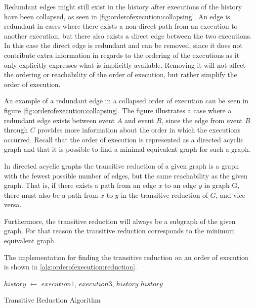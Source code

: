 	\newpar Redundant edges might still exist in the history after executions of the history have been collapsed, as seen in \autoref{fig:orderofexecution:collapsing}. An edge is redundant in cases where there exists a non-direct path from an execution to another execution, but there also exists a direct edge between the two executions. In this case the direct edge is redundant and can be removed, since it does not contribute extra information in regards to the ordering of the executions as it only explicitly expresses what is implicitly available. Removing it will not affect the ordering or reachability of the order of execution, but rather simplify the order of execution.
	
	\newpar An example of a redundant edge in a collapsed order of execution can be seen in figure \autoref{fig:orderofexecution:collapsing}. The figure illustrates a case where a redundant edge exists between event $A$ and event $B$, since the edge from event $B$ through $C$ provides more information about the order in which the executions occurred. 
	Recall that the order of execution is represented as a directed acyclic graph and that it is possible to find a minimal equivalent graph for such a graph. 
	
	\newpar In directed acyclic graphs the transitive reduction of a given graph is a graph with the fewest possible number of edges, but the same reachability as the given graph.	That is, if there exists a path from an edge $x$ to an edge $y$ in graph G, there must also be a path from $x$ to $y$ in the transitive reduction of $G$, and vice versa.
		
	Furthermore, the transitive reduction will always be a subgraph of the given graph. For that reason the transitive reduction corresponds to the minimum equivalent graph.
	
	The implementation for finding the transitive reduction on an order of execution is shown in \autoref{alg:orderofexecution:reduction}.
	
	\begin{algorithm}[H]
		\begin{algorithmic}
										\State $history$ $\leftarrow$  {$execution1$, $execution3$, $history$}
									\EndIf
								\EndIf
							\EndFor
						\EndIf
					\EndFor
				\EndFor
			\State
			\Return $history$
			\EndFunction
		\end{algorithmic}
		\caption{Transitive Reduction Algorithm}
		\label{alg:orderofexecution:reduction}
	\end{algorithm}
	
